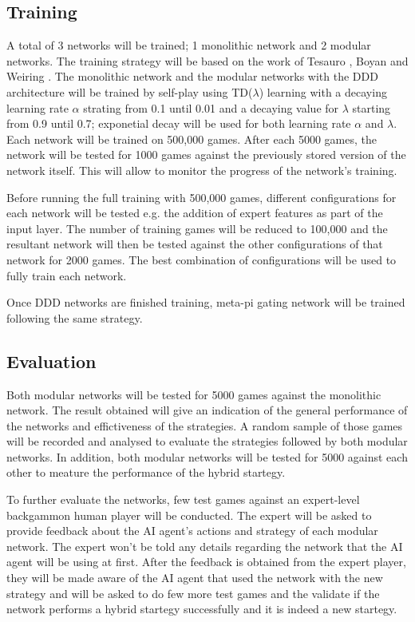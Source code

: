 \documentclass[12pt,a4paper]{article}
\begin{document}
\subsection{Training}
A total of 3 networks will be trained; 1 monolithic network and 2 modular networks. The training strategy will be based on the work of Tesauro \citeyear{DBLP:journals/neco/Tesauro94}, Boyan \citeyear{boyan} and Weiring \citeyear{DBLP:journals/jilsa/Wiering10}. The monolithic network and the modular networks with the DDD architecture will be trained by self-play using TD($\lambda$) learning with a decaying learning rate $\alpha$ strating from 0.1 until 0.01 and a decaying value for $\lambda$ starting from 0.9 until 0.7; exponetial decay will be used for both learning rate $\alpha$ and $\lambda$. Each network will be trained on 500,000 games. After each 5000 games, the network will be tested for 1000 games against the previously stored version of the network itself. This will allow to monitor the progress of the network's training. 

Before running the full training with 500,000 games, different configurations for each network will be tested e.g. the addition of expert features as part of the input layer. The number of training games will be reduced to 100,000 and the resultant network will then be tested against the other configurations of that network for 2000 games. The best combination of configurations will be used to fully train each network.

Once DDD networks are finished training, meta-pi gating network will be trained following the same strategy.

\subsection{Evaluation}
Both modular networks will be tested for 5000 games against the monolithic network. The result obtained will give an indication of the general performance of the networks and effictiveness of the strategies. A random sample of those games will be recorded and analysed to evaluate the strategies followed by both modular networks. In addition, both modular networks will be tested for 5000 against each other to meature the performance of the hybrid startegy.

To further evaluate the networks, few test games against an expert-level backgammon human player will be conducted. The expert will be asked to provide feedback about the AI agent's actions and strategy of each modular network. The expert won't be told any details regarding the network that the AI agent will be using at first. After the feedback is obtained from the expert player, they will be made aware of the AI agent that used the network with the new strategy and will be asked to do few more test games and the validate if the network performs a hybrid startegy successfully and it is indeed a new startegy.
\end{document}
